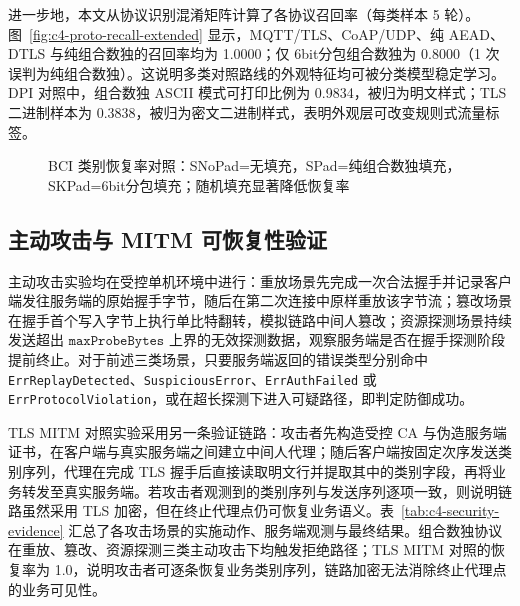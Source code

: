 进一步地，本文从协议识别混淆矩阵计算了各协议召回率（每类样本 5 轮）。图~\ref{fig:c4-proto-recall-extended} 显示，MQTT/TLS、CoAP/UDP、纯 AEAD、DTLS 与纯组合数独的召回率均为 1.0000；仅 6bit分包组合数独为 0.8000（1 次误判为纯组合数独）。这说明多类对照路线的外观特征均可被分类模型稳定学习。DPI 对照中，组合数独 ASCII 模式可打印比例为 0.9834，被归为明文样式；TLS 二进制样本为 0.3838，被归为密文二进制样式，表明外观层可改变规则式流量标签。

\begin{figure}[!t]
\centering
\small
{}
\caption{BCI 类别恢复率对照：SNoPad=无填充，SPad=纯组合数独填充，SKPad=6bit分包填充；随机填充显著降低恢复率}
\label{fig:c4-sidechannel-dpi}
\end{figure}
\FloatBarrier

\subsection{主动攻击与 MITM 可恢复性验证}
主动攻击实验均在受控单机环境中进行：重放场景先完成一次合法握手并记录客户端发往服务端的原始握手字节，随后在第二次连接中原样重放该字节流；篡改场景在握手首个写入字节上执行单比特翻转，模拟链路中间人篡改；资源探测场景持续发送超出 $\texttt{maxProbeBytes}$ 上界的无效探测数据，观察服务端是否在握手探测阶段提前终止。对于前述三类场景，只要服务端返回的错误类型分别命中 \texttt{ErrReplayDetected}、\texttt{SuspiciousError}、\texttt{ErrAuthFailed} 或 \texttt{ErrProtocolViolation}，或在超长探测下进入可疑路径，即判定防御成功。

TLS MITM 对照实验采用另一条验证链路：攻击者先构造受控 CA 与伪造服务端证书，在客户端与真实服务端之间建立中间人代理；随后客户端按固定次序发送类别序列，代理在完成 TLS 握手后直接读取明文行并提取其中的类别字段，再将业务转发至真实服务端。若攻击者观测到的类别序列与发送序列逐项一致，则说明链路虽然采用 TLS 加密，但在终止代理点仍可恢复业务语义。表~\ref{tab:c4-security-evidence} 汇总了各攻击场景的实施动作、服务端观测与最终结果。组合数独协议在重放、篡改、资源探测三类主动攻击下均触发拒绝路径；TLS MITM 对照的恢复率为 1.0，说明攻击者可逐条恢复业务类别序列，链路加密无法消除终止代理点的业务可见性\cite{wilkens2021passivetls}。

